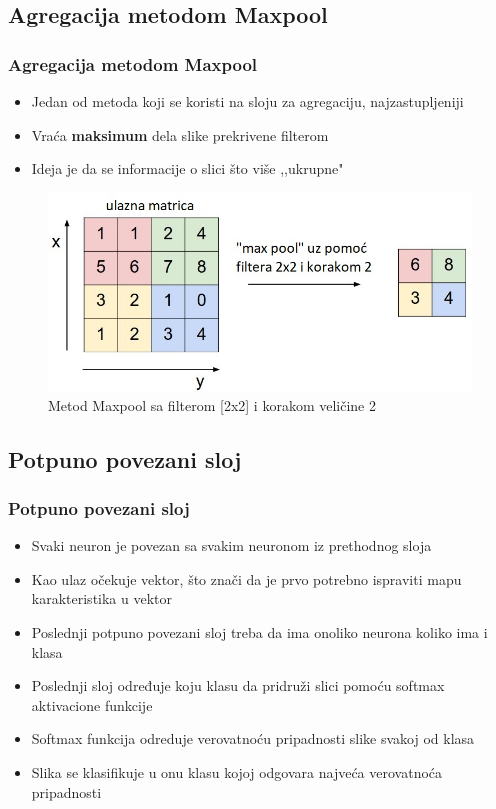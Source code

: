 \documentclass{beamer}
\begin{document}
\subsection{Agregacija metodom Maxpool}
\begin{frame}
\frametitle{Agregacija metodom Maxpool}

\begin{itemize}
\item Jedan od metoda koji se koristi na sloju za agregaciju, najzastupljeniji
\item Vraća \textbf{maksimum} dela slike prekrivene filterom 
\item Ideja je da se informacije o slici što više ,,ukrupne"
\end{itemize}

\begin{figure}
\includegraphics[scale=0.5]{maxpool.jpeg}
\caption{Metod Maxpool sa filterom [2x2] i korakom veličine 2}
\end{figure}

\end{frame}



\subsection{Potpuno povezani sloj}
\begin{frame}
\frametitle{Potpuno povezani sloj}

\begin{itemize}
\item Svaki neuron je povezan sa svakim neuronom iz prethodnog sloja
\item Kao ulaz očekuje vektor, što znači da je prvo potrebno ispraviti mapu karakteristika u vektor
\item Poslednji potpuno povezani sloj treba da ima onoliko neurona koliko ima i klasa
\item Poslednji sloj određuje koju klasu da pridruži slici pomoću softmax aktivacione funkcije
\item Softmax funkcija odreduje verovatnoću pripadnosti slike svakoj od klasa
\item Slika se klasifikuje u onu klasu kojoj odgovara najveća verovatnoća pripadnosti
\end{itemize}

\end{frame}
\end{document}

